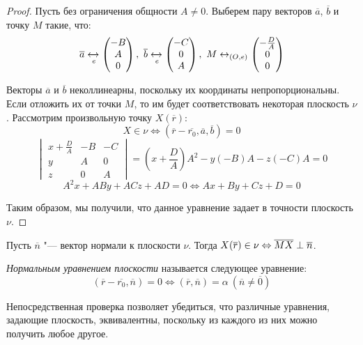 \begin{proof}
	Пусть без ограничения общности $A \ne 0$. Выберем пару векторов $\overline{a}$, $\overline{b}$ и точку $M$ такие, что: \[\overline{a} \xleftrightarrow[e]{} \begin{pmatrix}-B\\A\\0\end{pmatrix},~\overline{b} \xleftrightarrow[e]{} \begin{pmatrix}-C\\0\\A\end{pmatrix},~M \leftrightarrow_{(O, e)} \begin{pmatrix}-\frac{D}{A}\\0\\0\end{pmatrix}\]
	
	Векторы $\overline{a}$ и $\overline{b}$ неколлинеарны, поскольку их координаты непропорциональны. Если отложить их от точки $M$, то им будет соответствовать некоторая плоскость $\nu$. Рассмотрим произвольную точку $X(\overline{r})$:
	\[X \in \nu \Leftrightarrow (\overline{r} - \overline{r_0}, \overline{a}, \overline{b}) = 0\]
	\[\begin{vmatrix}
	x + \frac{D}{A} & -B & -C\\
	y & A & 0\\
	z & 0 & A
	\end{vmatrix} = (x + \frac{D}{A})A^2 - y(-B)A - z(-C)A = 0\]
	\[A^2x + ABy + ACz + AD = 0 \Leftrightarrow Ax + By + Cz + D = 0\]
	
	Таким образом, мы получили, что данное уравнение задает в точности плоскость $\nu$.
\end{proof}

Пусть $\overline{n}$ "--- вектор нормали к плоскости $\nu$. Тогда $X (\overline{r}) \in \nu \hm{\Leftrightarrow} \overline{MX} \perp \overline{n}$.

\begin{definition}
	\textit{Нормальным уравнением плоскости} называется следующее уравнение:
	\[(\overline{r} - \overline{r_0}, \overline{n}) = 0 \Leftrightarrow (\overline{r}, \overline{n}) = \alpha~(\overline{n} \ne \overline{0})\]
\end{definition}

\begin{note}
	Непосредственная проверка позволяет убедиться, что различные уравнения, задающие плоскость, эквивалентны, поскольку из каждого из них можно получить любое другое.
\end{note}

